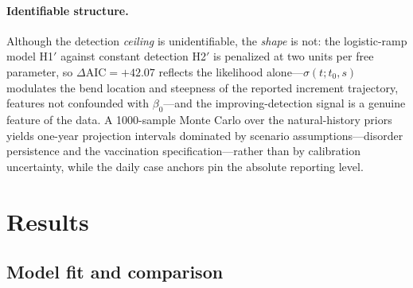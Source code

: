 \documentclass[preprint,12pt,numbers]{elsarticle}
\begin{document}
\paragraph{Identifiable structure.}
Although the detection \emph{ceiling} is unidentifiable, the \emph{shape}
is not: the logistic-ramp model H1$'$ against constant detection H2$'$
is penalized at two units per free parameter, so
$\Delta\mathrm{AIC}=+42.07$ reflects the likelihood
alone---$\sigma(t;t_0,s)$ modulates the bend location and steepness of
the reported increment trajectory, features not confounded with
$\beta_0$---and the improving-detection signal is a genuine feature of
the data. A 1000-sample Monte Carlo over the natural-history priors
yields one-year projection intervals dominated by scenario
assumptions---disorder persistence and the vaccination
specification---rather than by calibration uncertainty, while the daily
case anchors pin the absolute reporting level.
\section{Results}\label{sec:results}

\subsection{Model fit and comparison}
\end{document}
